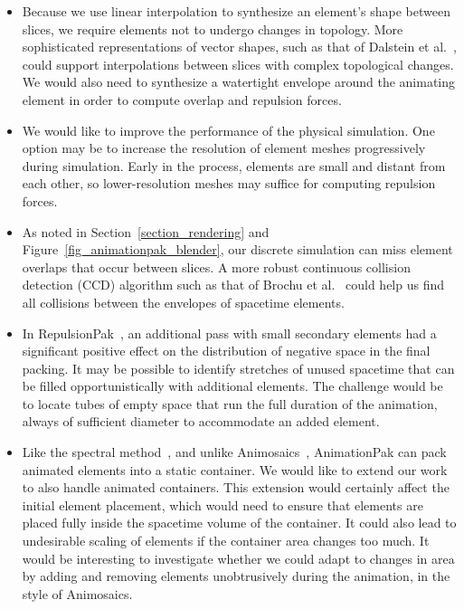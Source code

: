 \begin{itemize}
\item Because we use linear interpolation to synthesize an element's shape
	between slices, we require elements not to undergo changes in 
	topology.  More sophisticated representations of vector shapes,
	such as that of Dalstein et al.~\cite{Dalstein2015}, could support
	interpolations between slices with complex topological changes.
	We would also need to synthesize a watertight envelope around the
	animating element in order to compute overlap and repulsion forces.

\item We would like to improve the performance of the physical simulation.
	One option may be to increase the resolution of element meshes 
	progressively during simulation.  Early in the process, elements are
	small and distant from each other, so lower-resolution
	meshes may suffice for computing repulsion forces.

\item As noted in Section~\ref{section_rendering} and Figure~\ref{fig_animationpak_blender},
	our discrete simulation can miss element overlaps that occur between
	slices.  A more robust continuous collision detection (CCD) algorithm
	such as that of Brochu et al.~\cite{Brochu2012}
	could help us find all collisions between
	the envelopes of spacetime elements.

\item In RepulsionPak~\cite{Saputra2018}, an additional pass with
	small secondary elements had a significant positive effect on the
	distribution of negative space in the final packing.  It may be
	possible to identify stretches of unused spacetime that can be filled
	opportunistically with additional elements.  The challenge would be
	to locate tubes of empty space that run the full duration of the
	animation, always of sufficient diameter to accommodate an added
	element.

\item Like the spectral method~\cite{Dalal2006}, and unlike
	Animosaics~\cite{Smith2005}, AnimationPak can pack animated 
	elements into a static container.  We would like to extend
	our work to also handle animated containers.  This extension
	would certainly affect the initial element placement, which 
	would need to ensure that elements are placed fully inside the
	spacetime volume of the container.  It could also lead to undesirable
	scaling of elements if the container area changes too much.  It would
	be interesting to investigate whether we could adapt to changes in
	area by adding and removing elements unobtrusively during
	the animation, in the style of Animosaics.


\end{itemize}
